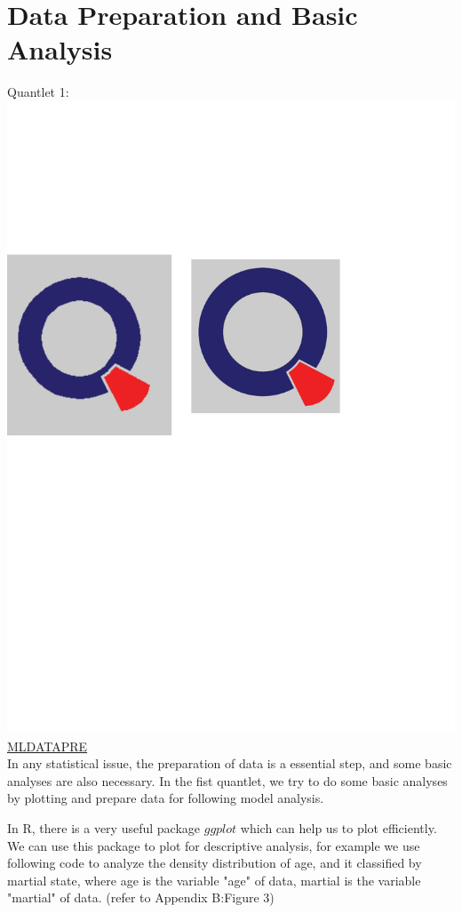 \documentclass[12pt, a4paper, bibliography=totoc, english]{scrartcl}
\begin{document}
\section{Data Preparation and Basic Analysis}\label{DPBA}
Quantlet 1:\includegraphics[scale=0.08]{qletlogo}
\textcolor{blue}{\href{https://github.com/JingyiLiu3136/MLFBM/tree/master/MLDATAPRE}{MLDATAPRE}}\vspace{3mm}\\
In any statistical issue, the preparation of data is a essential step, and some basic analyses are also necessary. In the fist quantlet, we try to do some basic analyses by plotting and prepare data for following model analysis.

In R, there is a very useful package $ggplot$ which can help us to plot efficiently. We can use this package to plot for descriptive analysis, for example we use following code to analyze the density distribution of age, and it classified by martial state, where age is the variable "age" of data, martial is the variable "martial" of data. (refer to Appendix B:Figure 3)
\end{document}
